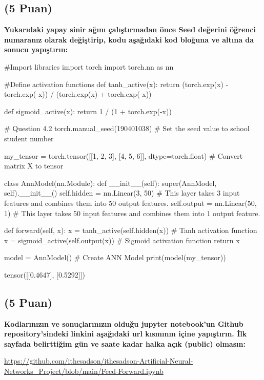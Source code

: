 \documentclass[11pt]{article}
\begin{document}
\subsection{(5 Puan)} \textbf{Yukarıdaki yapay sinir ağını çalıştırmadan önce Seed değerini öğrenci numaranız olarak değiştirip, kodu aşağıdaki kod bloğuna ve altına da sonucu yapıştırın:}

\begin{python}
#Import libraries
import torch
import torch.nn as nn

#Define activation functions
def tanh_active(x):
    return (torch.exp(x) - torch.exp(-x)) / (torch.exp(x) + torch.exp(-x))

def sigmoid_active(x):
    return 1 / (1 + torch.exp(-x))

# Question 4.2
torch.manual_seed(190401038)  # Set the seed value to school student number

my_tensor = torch.tensor([[1, 2, 3], [4, 5, 6]], dtype=torch.float)  # Convert matrix X to tensor

class AnnModel(nn.Module):
    def __init__(self):
        super(AnnModel, self).__init__()
        self.hidden = nn.Linear(3, 50)  # This layer takes 3 input features and combines them into 50 output features.
        self.output = nn.Linear(50, 1)  # This layer takes 50 input features and combines them into 1 output feature.

    def forward(self, x):
        x = tanh_active(self.hidden(x))  # Tanh activation function
        x = sigmoid_active(self.output(x))  # Sigmoid activation function
        return x

model = AnnModel()  # Create ANN Model
print(model(my_tensor))
\end{python}

tensor([[0.4647],
        [0.5292]])
\subsection{(5 Puan)} \textbf{Kodlarınızın ve sonuçlarınızın olduğu jupyter notebook'un Github repository'sindeki linkini aşağıdaki url kısmının içine yapıştırın. İlk sayfada belirttiğim gün ve saate kadar halka açık (public) olmasın:}

\url{https://github.com/ithesadson/ithesadson-Artificial-Neural-Networks_Project/blob/main/Feed-Forward.ipynb}
\end{document}
